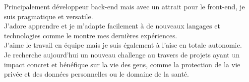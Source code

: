 \documentclass[8pt]{developercv} %
\begin{document}
\begin{minipage}[t]{0.5\textwidth} %
	\vspace{-0.5\baselineskip} %

	Principalement développeur back-end mais avec un attrait pour le front-end, je suis pragmatique et versatile.\\
	J'adore apprendre et je m'adapte facilement à de nouveaux langages et technologies comme le montre mes dernières expériences.\\
	J'aime le travail en équipe mais je suis également à l'aise en totale autonomie.\\

	Je recherche aujourd'hui un nouveau challenge au travers de projets ayant un impact concret et bénéfique sur la vie des gens, comme la protection de la vie privée et des données personnelles ou le domaine de la santé.
\end{minipage}
\hfill %
\begin{minipage}[t]{0.45\textwidth} %
	\vspace{-1.5\baselineskip} %
	\begin{barchart}{5.5}
	\end{barchart}
\end{minipage}

\vfill %
\end{document}
